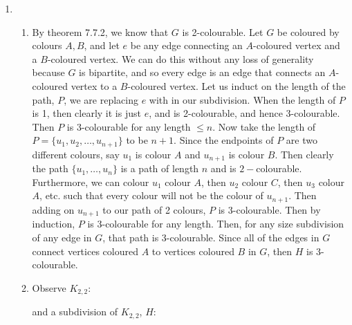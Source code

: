 \documentclass[10pt,english]{article}
\begin{document}
\begin{enumerate}

\pagebreak
\item \begin{enumerate}
    \item By theorem 7.7.2, we know that $G$ is 2-colourable. Let $G$ be coloured by colours $A,B$, and let $e$ be any edge connecting an $A$-coloured vertex and a $B$-coloured vertex. We can do this without any loss of generality because $G$ is bipartite, and so every edge is an edge that connects an $A$-coloured vertex to a $B$-coloured vertex. Let us induct on the length of the path, $P$, we are replacing $e$ with in our subdivision. When the length of $P$ is 1, then clearly it is just $e$, and is 2-colourable, and hence 3-colourable. Then $P$ is 3-colourable for any length $\leq n$. Now take the length of $P=\{u_1,u_2,\ldots,u_{n+1}\}$ to be $n+1$. Since the endpoints of $P$ are two different colours, say $u_1$ is colour $A$ and $u_{n+1}$ is colour $B$. Then clearly the path $\{u_1,\ldots,u_n\}$ is a path of length $n$ and is $2-$colourable. Furthermore, we can colour $u_1$ colour $A$, then $u_2$ colour $C$, then $u_3$ colour $A$, etc. such that every colour will not be the colour of $u_{n+1}$. Then adding on $u_{n+1}$ to our path of 2 colours, $P$ is 3-colourable. Then by induction, $P$ is 3-colourable for any length. Then, for any size subdivision of any edge in $G$, that path is 3-colourable. Since all of the edges in $G$ connect vertices coloured $A$ to vertices coloured $B$ in $G$, then $H$ is 3-colourable. 
    
    \item Observe $K_{2,2}$: 
 and a subdivision of $K_{2,2}$, $H$: 
\end{enumerate}
\end{enumerate}
\end{document}

